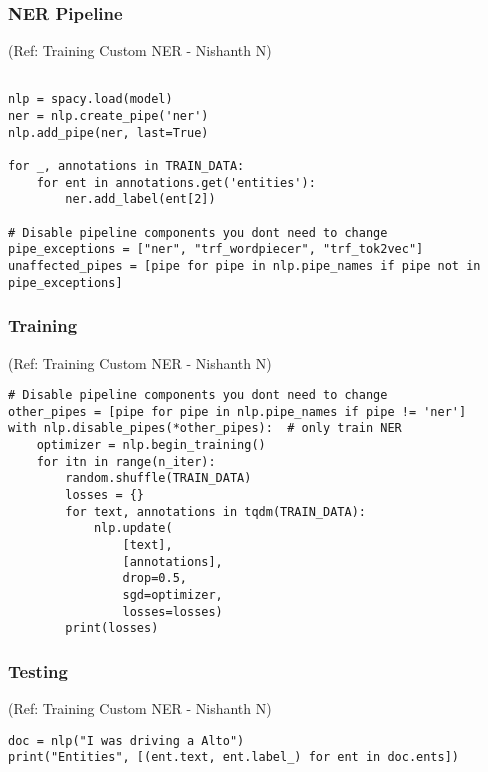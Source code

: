 \begin{frame}[fragile]\frametitle{NER Pipeline}

{\tiny (Ref: Training Custom NER - Nishanth N)}

\begin{lstlisting}

nlp = spacy.load(model)  
ner = nlp.create_pipe('ner')
nlp.add_pipe(ner, last=True)

for _, annotations in TRAIN_DATA:
    for ent in annotations.get('entities'):
        ner.add_label(ent[2])
				
# Disable pipeline components you dont need to change
pipe_exceptions = ["ner", "trf_wordpiecer", "trf_tok2vec"]
unaffected_pipes = [pipe for pipe in nlp.pipe_names if pipe not in pipe_exceptions]

\end{lstlisting}


\end{frame}

\begin{frame}[fragile]\frametitle{Training}

{\tiny (Ref: Training Custom NER - Nishanth N)}

\begin{lstlisting}
# Disable pipeline components you dont need to change
other_pipes = [pipe for pipe in nlp.pipe_names if pipe != 'ner']
with nlp.disable_pipes(*other_pipes):  # only train NER
    optimizer = nlp.begin_training()
    for itn in range(n_iter):
        random.shuffle(TRAIN_DATA)
        losses = {}
        for text, annotations in tqdm(TRAIN_DATA):
            nlp.update(
                [text],  
                [annotations],  
                drop=0.5,  
                sgd=optimizer,
                losses=losses)
        print(losses)
\end{lstlisting}


\end{frame}

\begin{frame}[fragile]\frametitle{Testing}

{\tiny (Ref: Training Custom NER - Nishanth N)}

\begin{lstlisting}
doc = nlp("I was driving a Alto")
print("Entities", [(ent.text, ent.label_) for ent in doc.ents])
\end{lstlisting}


\end{frame}